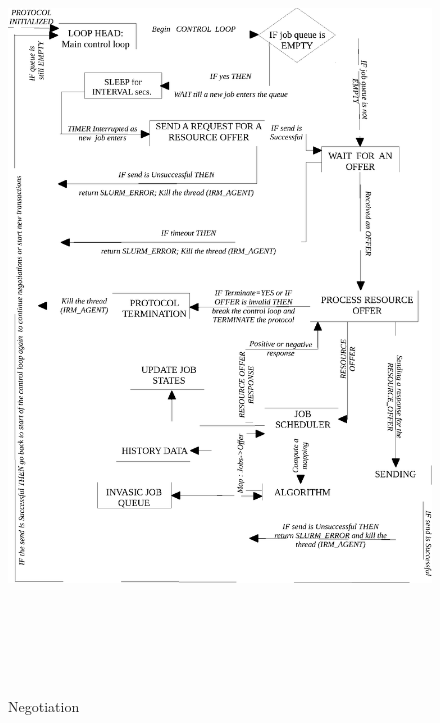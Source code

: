 \documentclass[a4paper, 12pt]{article}
\begin{document}
\clearpage
\begin{figure}[h]
\centering
\includegraphics[width=1.0\textwidth, height=210mm]{./Negotiation.eps}
\caption{Negotiation}
\label{fig:Neg}
\end{figure}
\clearpage
\end{document}

